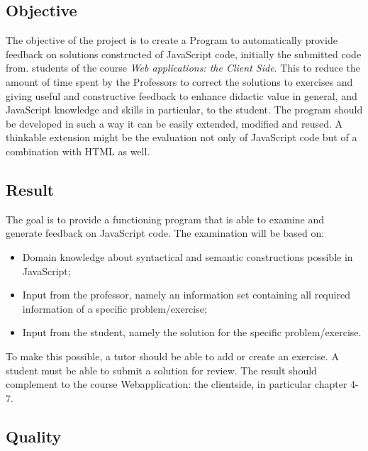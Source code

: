 \documentclass{article}
\begin{document}
\subsection{Objective}

The objective of the project is to create a Program to automatically provide 
feedback on solutions constructed of JavaScript code, initially the 
submitted code from.
students of the course {\em Web applications: the Client Side}. This to reduce
the amount of time spent by the Professors to correct the solutions to exercises
and giving useful and constructive feedback to enhance didactic value in
general, and JavaScript knowledge and skills in particular, to the student. The
program should be developed in such a way it can be easily extended, modified
and reused. A thinkable extension might be the evaluation not only of
JavaScript code but of a combination with HTML as well.

\subsection{Result} 

The goal is to provide a functioning program that is able to examine and 
generate feedback on JavaScript code. The examination will be based on: 

\begin{itemize} \item Domain knowledge about syntactical and semantic
constructions possible in JavaScript; \item Input from the professor, namely an
information set containing all required information of a specific
problem/exercise; \item Input from the student, namely the solution for the
specific problem/exercise. \end{itemize} To make this possible, a tutor should
be able to add or create an exercise. A student must be able to submit a
solution for review. The result should complement to the course Webapplication:
the clientside, in particular chapter 4-7.

\subsection{Quality} 
\end{document}
